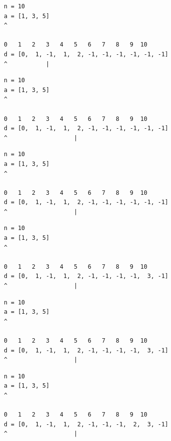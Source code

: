 \begin{frame}[fragile]
\begin{verbatim}
n = 10
a = [1, 3, 5]
^

0   1   2   3   4   5   6   7   8   9  10
d = [0,  1, -1,  1,  2, -1, -1, -1, -1, -1, -1]
^           |
\end{verbatim}
\end{frame}
\addtocounter{framenumber}{-1}

\begin{frame}[fragile]
\begin{verbatim}
n = 10
a = [1, 3, 5]
^

0   1   2   3   4   5   6   7   8   9  10
d = [0,  1, -1,  1,  2, -1, -1, -1, -1, -1, -1]
^                   |
\end{verbatim}
\end{frame}
\addtocounter{framenumber}{-1}

\begin{frame}[fragile]
\begin{verbatim}
n = 10
a = [1, 3, 5]
^

0   1   2   3   4   5   6   7   8   9  10
d = [0,  1, -1,  1,  2, -1, -1, -1, -1, -1, -1]
^                   |
\end{verbatim}
\end{frame}
\addtocounter{framenumber}{-1}

\begin{frame}[fragile]
\begin{verbatim}
n = 10
a = [1, 3, 5]
^

0   1   2   3   4   5   6   7   8   9  10
d = [0,  1, -1,  1,  2, -1, -1, -1, -1,  3, -1]
^                   |
\end{verbatim}
\end{frame}
\addtocounter{framenumber}{-1}

\begin{frame}[fragile]
\begin{verbatim}
n = 10
a = [1, 3, 5]
^

0   1   2   3   4   5   6   7   8   9  10
d = [0,  1, -1,  1,  2, -1, -1, -1, -1,  3, -1]
^                   |
\end{verbatim}
\end{frame}
\addtocounter{framenumber}{-1}

\begin{frame}[fragile]
\begin{verbatim}
n = 10
a = [1, 3, 5]
^

0   1   2   3   4   5   6   7   8   9  10
d = [0,  1, -1,  1,  2, -1, -1, -1,  2,  3, -1]
^                   |
\end{verbatim}
\end{frame}
\addtocounter{framenumber}{-1}

